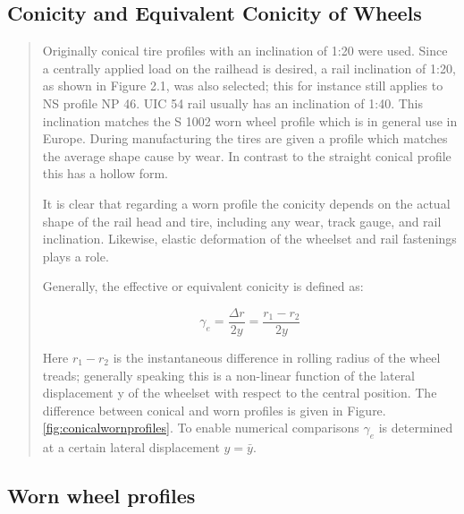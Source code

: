 \subsection{Conicity and Equivalent Conicity of Wheels}

\begin{quote}

Originally conical tire profiles with an inclination of 1:20 were used. Since a centrally applied load on the railhead is desired, a rail inclination of 1:20, as shown in Figure 2.1, was also selected; this for instance still applies to NS profile NP 46. UIC 54 rail usually has an inclination of 1:40. This inclination matches the S 1002 worn wheel profile which is in general use in Europe. During manufacturing the tires are given a profile which matches the average shape cause by wear. In contrast to the straight conical profile this has a hollow form.

It is clear that regarding a worn profile the conicity depends on the actual shape of the rail head and tire, including any wear, track gauge, and rail inclination. Likewise, elastic deformation of the wheelset and rail fastenings plays a role.

Generally, the effective or equivalent conicity is defined as:

$$ \gamma_e = \frac{\Delta r}{2y} = \frac{r_1 - r_2}{2y}  $$

Here $r_1 - r_2$ is the instantaneous difference in rolling radius of the wheel treads; generally speaking this is a non-linear function of the lateral displacement y of the wheelset with respect to the central position. The difference between conical and worn profiles is given in Figure.\ref{fig:conicalwornprofiles}. To enable numerical comparisons $\gamma_e$ is determined at a certain lateral displacement $y=\bar{y}$.

\end{quote}

\subsection{Worn wheel profiles}

